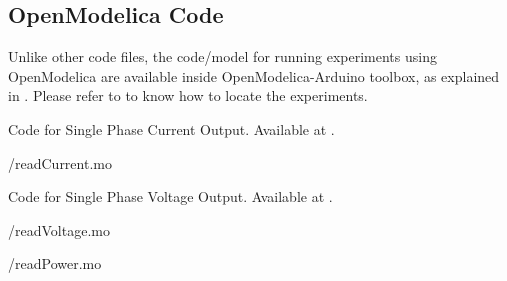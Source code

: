 \subsection{OpenModelica Code}
Unlike other code files, the code/model for running experiments using OpenModelica are available inside OpenModelica-Arduino toolbox, as explained in . Please refer to  to know how to locate the experiments.

\label{sec:modbus-OpenModelica-code}

\begin{OpenModelicacode}
    {Code for Single Phase Current Output.
        Available at .}
    \label{OpenModelica:current-modbus}
    
    {\LocMODOpenModelicacode/readCurrent.mo}
\end{OpenModelicacode}

\begin{OpenModelicacode}
    {Code for Single Phase Voltage Output.
        Available at .}
    \label{OpenModelica:voltage-modbus}
    
    {\LocMODOpenModelicacode/readVoltage.mo}
\end{OpenModelicacode}

\begin{OpenModelicacode}
    \label{OpenModelica:modbus-power}
    
    {\LocMODOpenModelicacode/readPower.mo}
\end{OpenModelicacode}

